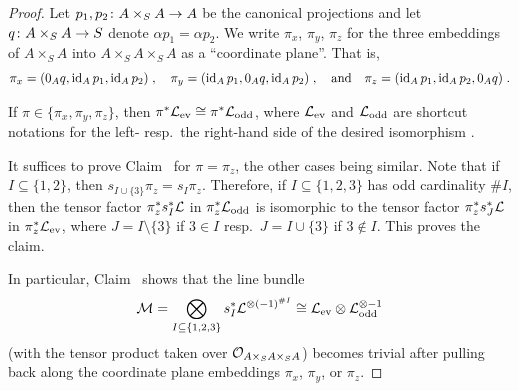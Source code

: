 \documentclass[a4paper,parskip=half,numbers=enddot, DIV=12]{scrreprt}
\begin{document}
\begin{proof}
	Let $p_1,p_2\colon A\times_SA\morphism A$ be the canonical projections and let $q\colon A\times_SA\morphism S$ denote $\alpha p_1=\alpha p_2$. We write $\pi_x$, $\pi_y$, $\pi_z$ for the three embeddings of $A\times_SA$ into $A\times_SA\times_SA$ as a ``coordinate plane''. That is, 
	\begin{align*}
		\pi_x=( 0_Aq,\operatorname{id}_A p_1,\operatorname{id}_Ap_2)\;,\quad\pi_y=(\operatorname{id}_A p_1, 0_Aq,\operatorname{id}_Ap_2)\;,\quad\text{and}\quad \pi_z=(\operatorname{id}_A p_1,\operatorname{id}_Ap_2, 0_Aq)\;.
	\end{align*}
	\begin{claim}
		If $\pi\in\{\pi_x,\pi_y,\pi_z\}$, then $\pi^*\mathcal{L}_{\mathrm{ev}}\cong \pi^*\mathcal{L}_{\mathrm{odd}}$, where $\mathcal{L}_{\mathrm{ev}}$ and $\mathcal{L}_{\mathrm{odd}}$ are shortcut notations for the left- resp.\ the right-hand side of the desired isomorphism .
	\end{claim}
	It suffices to prove Claim~ for $\pi=\pi_z$, the other cases being similar. Note that if $I\subseteq\{1,2\}$, then $s_{I\cup\{3\}}\pi_z=s_I\pi_z$. Therefore, if $I\subseteq \{1,2,3\}$ has odd cardinality $\#I$, then the tensor factor $\pi_z^*s_I^*\mathcal{L}$ in $\pi_z^*\mathcal{L}_{\mathrm{odd}}$ is isomorphic to the tensor factor $\pi_z^*s_J^*\mathcal{L}$ in $\pi_z^*\mathcal{L}_{\mathrm{ev}}$, where $J=I\setminus \{3\}$ if $3\in I$ resp.\ $J=I\cup\{3\}$ if $3\notin I$. This proves the claim.
	
	In particular, Claim~ shows that the line bundle
	\begin{align*}
		\mathcal{M}=\bigotimes_{I\subseteq \{1,2,3\}}s_I^*\mathcal{L}^{\otimes (-1)^{\# I}}\cong \mathcal{L}_{\mathrm{ev}}\otimes\mathcal{L}_{\mathrm{odd}}^{\otimes -1}
	\end{align*}
	(with the tensor product taken over $\mathcal{O}_{A\times_SA\times_SA}$) becomes trivial after pulling back along the coordinate plane embeddings $\pi_x$, $\pi_y$, or $\pi_z$.
	

\end{proof}
\end{document}
